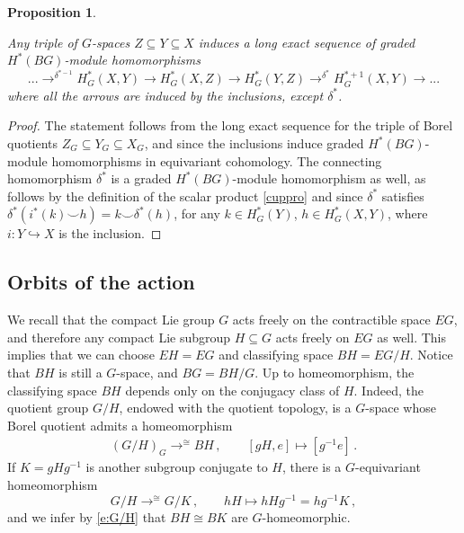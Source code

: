 \documentclass[11pt,a4paper,reqno]{article}
\DeclareMathOperator*{\toup}{\longrightarrow}
\numberwithin{equation}{section}
\newtheorem{proposition}[theorem]{Proposition}
\theoremstyle{definition}
\begin{document}
\begin{proposition}
\label{prop:long}

Any triple of $G$-spaces $Z\subseteq Y\subseteq X$ induces a long exact sequence of graded $H^*(BG)$-module homomorphisms
\begin{equation}
\label{incltripla}
 ...\toup^{\delta^{*-1}} H^*_G(X,Y) \toup H^*_G(X,Z) \toup H^*_G(Y,Z) \toup^{\delta^*} H^{*+1}_G(X,Y) \toup...
\end{equation}
where all the arrows  are induced by the inclusions, 
except  $\delta^*$. 
\end{proposition}

\begin{proof}
The statement follows from the long exact sequence  for the triple of Borel quotients $Z_G\subseteq Y_G\subseteq X_G$, and since the inclusions induce graded $H^*(BG)$-module homomorphisms in equivariant cohomology. The connecting homomorphism $\delta^*$ is a graded $H^*(BG)$-module homomorphism as well, as  follows by the definition of the scalar product \eqref{cuppro} and since $\delta^*$ satisfies 
$ \delta^*(i^*(k)\smallsmile h)=k\smallsmile\delta^*(h) $,
for any $ k\in H^*_G(Y)$, 
$ h\in H^*_G(X,Y) $, 
where $i:Y\hookrightarrow X$ is the inclusion.
\end{proof}










\subsection{Orbits of the action}\label{ss:orbits}
We recall that the compact Lie group $G$ acts freely on the contractible space $EG$, and therefore any compact Lie subgroup $H\subseteq G$ acts freely on $EG$ as well. This implies that we can choose $EH=EG$ and classifying space $BH=EG/H$. Notice that $BH$ is still a $G$-space, and $BG=BH/G$. Up to homeomorphism, the classifying space $BH$ depends only on the conjugacy class of $H$. Indeed, the quotient group $G/H$, endowed with the quotient topology, is a $G$-space whose Borel quotient admits a homeomorphism
\begin{align}
\label{e:G/H}
(G/H)_G \toup^{\cong} BH \, ,\qquad [gH,e]\mapsto[g^{-1}e] \, .
\end{align}
If $K=gHg^{-1}$ is another subgroup conjugate to $H$, there is a $G$-equivariant homeomorphism 
\[G/H\toup^{\cong} G/K \, ,\qquad hH\mapsto hHg^{-1}=hg^{-1}K \, ,\] 
and we infer by \eqref{e:G/H} that $BH\cong BK$ are $G$-homeomorphic.
\end{document}
